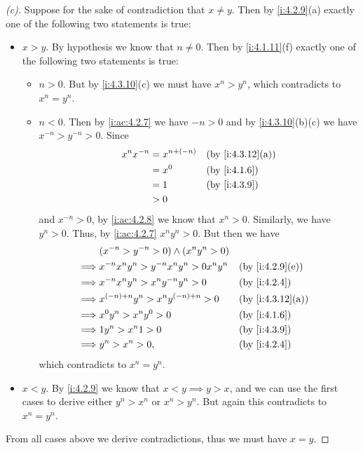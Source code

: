 \begin{proof}[(c)]
  Suppose for the sake of contradiction that \(x \neq y\).
  Then by \cref{i:4.2.9}(a) exactly one of the following two statements is true:
  \begin{itemize}
    \item \(x > y\).
          By hypothesis we know that \(n \neq 0\).
          Then by \cref{i:4.1.11}(f) exactly one of the following two statements is true:
          \begin{itemize}
            \item \(n > 0\).
                  But by \cref{i:4.3.10}(c) we must have \(x^n > y^n\), which contradicts to \(x^n = y^n\).
            \item \(n < 0\).
                  Then by \cref{i:ac:4.2.7} we have \(-n > 0\) and by \cref{i:4.3.10}(b)(c) we have \(x^{-n} > y^{-n} > 0\).
                  Since
                  \begin{align*}
                    x^n x^{-n} & = x^{n + (-n)} &  & \by{i:4.3.12}[a] \\
                               & = x^0          &  & \by{i:4.1.6}     \\
                               & = 1            &  & \by{i:4.3.9}     \\
                               & > 0
                  \end{align*}
                  and \(x^{-n} > 0\), by \cref{i:ac:4.2.8} we know that \(x^n > 0\).
                  Similarly, we have \(y^n > 0\).
                  Thus, by \cref{i:ac:4.2.7} \(x^n y^n > 0\).
                  But then we have
                  \begin{align*}
                             & (x^{-n} > y^{-n} > 0) \land (x^n y^n > 0)                         \\
                    \implies & x^{-n} x^n y^n > y^{-n} x^n y^n > 0 x^n y^n &  & \by{i:4.2.9}[e]  \\
                    \implies & x^{-n} x^n y^n > x^n y^{-n} y^n > 0         &  & \by{i:4.2.4}     \\
                    \implies & x^{(-n) + n} y^n > x^n y^{(-n) + n} > 0     &  & \by{i:4.3.12}[a] \\
                    \implies & x^0 y^n > x^n y^0 > 0                       &  & \by{i:4.1.6}     \\
                    \implies & 1 y^n > x^n 1 > 0                           &  & \by{i:4.3.9}     \\
                    \implies & y^n > x^n > 0,                              &  & \by{i:4.2.4}
                  \end{align*}
                  which contradicts to \(x^n = y^n\).
          \end{itemize}
    \item \(x < y\).
          By \cref{i:4.2.9} we know that \(x < y \implies y > x\), and we can use the first cases to derive either \(y^n > x^n\) or \(x^n > y^n\).
          But again this contradicts to \(x^n = y^n\).
  \end{itemize}
  From all cases above we derive contradictions, thus we must have \(x = y\).
\end{proof}

